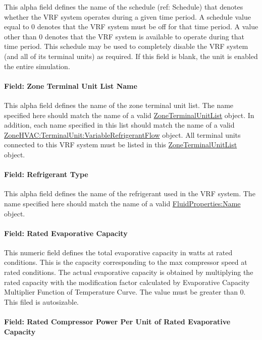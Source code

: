 This alpha field defines the name of the schedule (ref: Schedule) that denotes whether the VRF system operates during a given time period. A schedule value equal to 0 denotes that the VRF system must be off for that time period. A value other than 0 denotes that the VRF system is available to operate during that time period. This schedule may be used to completely disable the VRF system (and all of its terminal units) as required. If this field is blank, the unit is enabled the entire simulation.

\paragraph{Field: Zone Terminal Unit List Name}

This alpha field defines the name of the zone terminal unit list. The name specified here should match the name of a valid \hyperref[zoneterminalunitlist]{ZoneTerminalUnitList} object. In addition, each name specified in this list should match the name of a valid \hyperref[zonehvacterminalunitvariablerefrigerantflow]{ZoneHVAC:TerminalUnit:VariableRefrigerantFlow} object. All terminal units connected to this VRF system must be listed in this \hyperref[zoneterminalunitlist]{ZoneTerminalUnitList} object.

\paragraph{Field: Refrigerant Type}

This alpha field defines the name of the refrigerant used in the VRF system. The name specified here should match the name of a valid \hyperref[fluidpropertiesname]{FluidProperties:Name} object.

\paragraph{Field: Rated Evaporative Capacity}

This numeric field defines the total evaporative capacity in watts at rated conditions. This is the capacity corresponding to the max compressor speed at rated conditions. The actual evaporative capacity is obtained by multiplying the rated capacity with the modification factor calculated by Evaporative Capacity Multiplier Function of Temperature Curve. The value must be greater than 0. This filed is autosizable.

\paragraph{Field: Rated Compressor Power Per Unit of Rated Evaporative Capacity}

